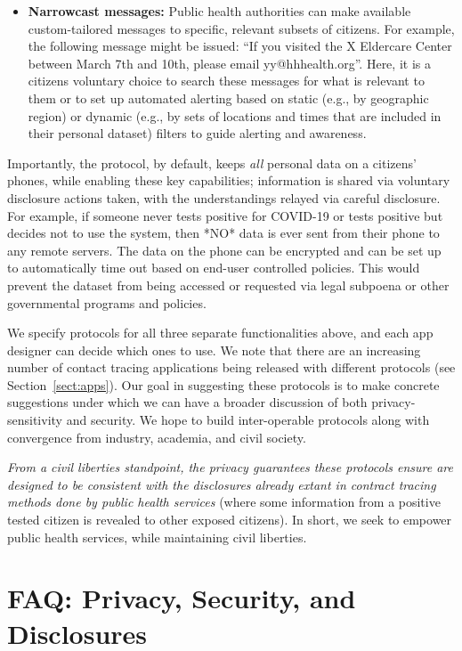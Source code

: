 \documentclass{article}
\begin{document}
\begin{itemize}
\item \textbf{Narrowcast messages:}  Public health authorities can make available
  custom-tailored messages to specific, relevant subsets of citizens.  For example, the following message might be issued: ``If you visited
  the X Eldercare Center between March 7th and 10th, please email yy@hhhealth.org''.  Here, it is a citizens voluntary choice to search these messages for what is relevant to them or to set up automated alerting based on static (e.g., by geographic region) or dynamic (e.g., by sets of locations and times that are included in their personal dataset) filters to guide alerting and awareness.
  
\end{itemize}

Importantly, the protocol, by default, keeps \emph{all} personal data on a citizens' phones, while enabling these key capabilities; information is shared via voluntary disclosure actions taken, with the understandings relayed via careful disclosure. For example, if someone never tests positive for COVID-19 or tests positive but decides not to use the system, then *NO* data is ever sent from their phone to any remote servers. The data on the phone can be encrypted and can be set up to automatically time out based on end-user controlled policies.  This would prevent the dataset from being accessed or requested via legal subpoena or other governmental programs and policies.

 We specify protocols for all three separate functionalities above, and each app designer can decide which ones to use. We note that there are an increasing number of contact tracing applications being released with different protocols (see Section~\ref{sect:apps}). Our goal in suggesting these protocols is to make concrete suggestions under which we can have a broader discussion of both privacy-sensitivity and security. We hope to build inter-operable protocols along with convergence from industry, academia, and civil society.
 
 \emph{From a civil liberties standpoint, the privacy guarantees these protocols ensure are designed to be consistent with the disclosures already extant in contract tracing methods done by public health services} (where some information from a positive tested citizen is revealed to other exposed citizens). In short, we seek to empower public health services, while maintaining civil liberties.

\section{FAQ: Privacy, Security, and Disclosures} \label{sect:FAQ}
\end{document}
